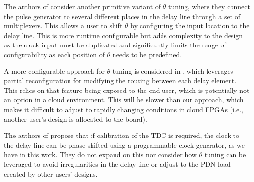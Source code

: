 The authors of \cite{krautter2020cpamap} consider another primitive variant of $\theta$ tuning, where they connect the pulse generator to several different places in the delay line through a set of multiplexers. This allows a user to shift $\theta$ by configuring the input location to the delay line. This is more runtime configurable but adds complexity to the design as the clock input must be duplicated and significantly limits the range of configurability as each position of $\theta$ needs to be predefined. 

A more configurable approach for $\theta$ tuning is considered in \cite{daigneault2011high}, which leverages partial reconfiguration for modifying the routing between each delay element. This relies on that feature being exposed to the end user, which is potentially not an option in a cloud environment. This will be slower than our approach, which makes it difficult to adjust to rapidly changing conditions in cloud FPGAs (i.e., another user's design is allocated to the board). 

The authors of \cite{zick2013sensing} propose that if calibration of the TDC is required, the clock to the delay line can be phase-shifted using a programmable clock generator, as we have in this work. They do not expand on this nor consider how $\theta$ tuning can be leveraged to avoid irregularities in the delay line or adjust to the PDN load created by other users' designs. 

